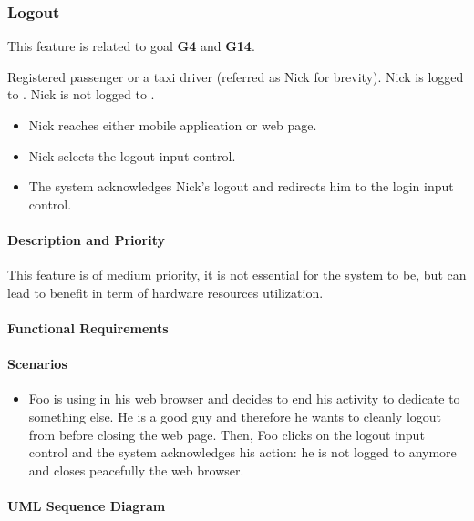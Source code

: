 \subsubsection{Logout}
This feature is related to goal \textbf{G4} and \textbf{G14}.
\begin{itemize}
	 Registered passenger or a taxi driver (referred as Nick for brevity).
	 Nick is logged to \myTaxiService{}.
	 Nick is not logged to \myTaxiService{}.
	\begin{itemize}
		\item Nick reaches either \myTaxiService{} mobile application or web page.
		\item Nick selects the logout input control.
		\item The system acknowledges Nick's logout and redirects him to the login input control.
	\end{itemize}
\end{itemize}
\paragraph{Description and Priority}
This feature is of medium priority, it is not essential for the system to be, but can lead to benefit in term of hardware resources utilization.\par
\paragraph{Functional Requirements}
\begin{itemize}
\end{itemize}
\paragraph{Scenarios}
\begin{itemize}
	\item Foo is using \myTaxiService{} in his web browser and decides to end his activity to dedicate to something else.
	He is a good guy and therefore he wants to cleanly logout from \myTaxiService{} before closing the web page.
	Then, Foo clicks on the logout input control and the system acknowledges his action: he is not logged to \myTaxiService{} anymore and closes peacefully the web browser.
\end{itemize}
\paragraph{UML Sequence Diagram}
